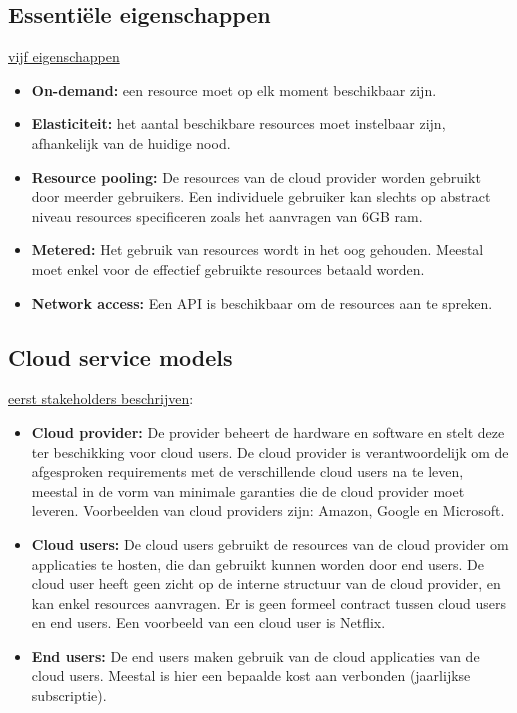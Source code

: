 \documentclass{report}
\begin{document}
	\subsection{Essentiële eigenschappen}
	\underline{vijf eigenschappen}
	\begin{itemize}
		\item[\info] \textbf{On-demand:} een resource moet op elk moment beschikbaar zijn.
		\item[\info] \textbf{Elasticiteit:} het aantal beschikbare resources moet instelbaar zijn, afhankelijk van de huidige nood.
		\item[\info] \textbf{Resource pooling:} De resources van de cloud provider worden gebruikt door meerder gebruikers. Een individuele gebruiker kan slechts op abstract niveau resources specificeren zoals het aanvragen van 6GB ram.
		\item[\info] \textbf{Metered:} Het gebruik van resources wordt in het oog gehouden. Meestal moet enkel voor de effectief gebruikte resources betaald worden.
		\item[\info] \textbf{Network access:} Een API is beschikbaar om de resources aan te spreken.
	\end{itemize}
	\subsection{Cloud service models}
	\underline{eerst stakeholders beschrijven}:
	\begin{itemize}
		\item[\info] \textbf{Cloud provider:} De provider beheert de hardware en software en stelt deze ter beschikking voor cloud users. De cloud provider is verantwoordelijk om de afgesproken requirements met de verschillende cloud users na te leven, meestal in de vorm van minimale garanties die de cloud provider moet leveren. Voorbeelden van cloud providers zijn: Amazon, Google en Microsoft.
		\item[\info] \textbf{Cloud users:} De cloud users gebruikt de resources van de cloud provider om applicaties te hosten, die dan gebruikt kunnen worden door end users. De cloud user heeft geen zicht op de interne structuur van de cloud provider, en kan enkel resources aanvragen. Er is geen formeel contract tussen cloud users en end users. Een voorbeeld van een cloud user is Netflix.
		\item[\info] \textbf{End users:} De end users maken gebruik van de cloud applicaties van de cloud users. Meestal is hier een bepaalde kost aan verbonden (jaarlijkse subscriptie).
	\end{itemize}
\end{document}
